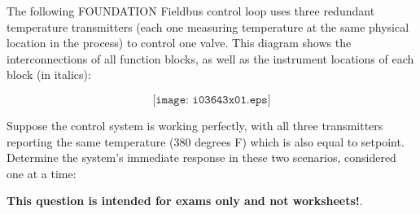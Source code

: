

The following FOUNDATION Fieldbus control loop uses three redundant temperature transmitters (each one measuring temperature at the same physical location in the process) to control one valve.  This diagram shows the interconnections of all function blocks, as well as the instrument locations of each block (in italics):

$$\texttt{[image: i03643x01.eps]}$$

Suppose the control system is working perfectly, with all three transmitters reporting the same temperature (380 degrees F) which is also equal to setpoint.  Determine the system's immediate response in these two scenarios, considered one at a time:

\vskip 10pt








{\bf This question is intended for exams only and not worksheets!}.




